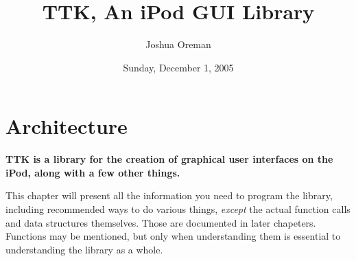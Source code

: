 \documentclass[12pt,letterpaper]{report}
\title{TTK, An iPod GUI Library}
\author{Joshua Oreman}
\date{Sunday, December 1, 2005}
\begin{document}
\maketitle
\tableofcontents

\chapter{Architecture}
{\bf TTK is a library for the creation of graphical user interfaces on the iPod, along with a few other things.}

\noindent This chapter will present all the information you need to program the library, including
recommended ways to do various things, \emph{except} the actual function calls and data structures themselves.
Those are documented in later chapeters. Functions may be mentioned, but only when understanding
them is essential to understanding the library as a whole.
\end{document}
